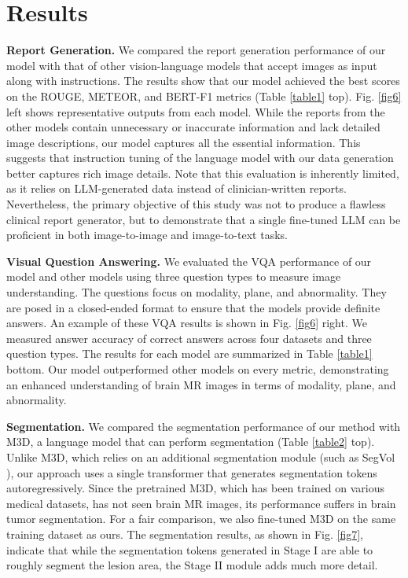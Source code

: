 \section{Results}
\noindent \textbf{Report Generation.} We compared the report generation performance of our model with that of other vision-language models that accept images as input along with instructions. The results show that our model achieved the best scores on the ROUGE, METEOR, and BERT-F1 metrics (Table \ref{table1} top). Fig. \ref{fig6} left shows representative outputs from each model. While the reports from the other models contain unnecessary or inaccurate information and lack detailed image descriptions, our model captures all the essential information. This suggests that instruction tuning of the language model with our data generation better captures rich image details. Note that this evaluation is inherently limited, as it relies on LLM-generated data instead of clinician-written reports. Nevertheless, the primary objective of this study was not to produce a flawless clinical report generator, but to demonstrate that a single fine-tuned LLM can be proficient in both image-to-image and image-to-text tasks.

\vspace{3pt}
\noindent \textbf{Visual Question Answering.} We evaluated the VQA performance of our model and other models using three question types to measure image understanding. The questions focus on modality, plane, and abnormality. They are posed in a closed-ended format to ensure that the models provide definite answers. An example of these VQA results is shown in Fig. \ref{fig6} right. We measured answer accuracy of correct answers across four datasets and three question types. The results for each model are summarized in Table \ref{table1} bottom. Our model outperformed other models on every metric, demonstrating an enhanced understanding of brain MR images in terms of modality, plane, and abnormality. 

\vspace{3pt}
\noindent \textbf{Segmentation.} We compared the segmentation performance of our method with M3D, a language model that can perform segmentation (Table \ref{table2} top). Unlike M3D, which relies on an additional segmentation module (such as SegVol \cite{du2024segvol}), our approach uses a single transformer that generates segmentation tokens autoregressively. 
Since the pretrained M3D, which has been trained on various medical datasets, has not seen brain MR images, its performance suffers in brain tumor segmentation. For a fair comparison, we also fine-tuned M3D on the same training dataset as ours. The segmentation results, as shown in Fig. \ref{fig7}, indicate that while the segmentation tokens generated in Stage I are able to roughly segment the lesion area, the Stage II module adds much more detail.

